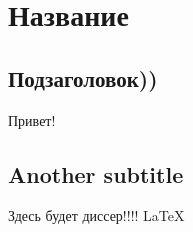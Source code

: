 \documentclass{article}
\begin{document}
\section{Название}

\subsection{Подзаголовок))} 
 
Привет!

\subsection{Another subtitle}

Здесь будет диссер!!!! \LaTeX
 
\end{document}
